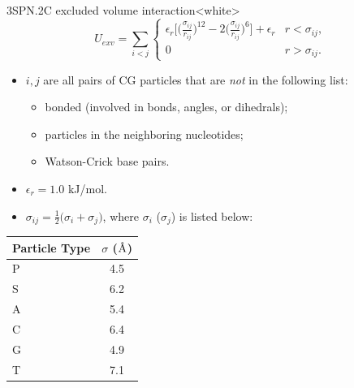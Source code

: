 \begin{smallpage}{3SPN.2C excluded volume interaction}<white>
  \begin{equation}
    \label{eq:dna_3spn2c_nonlocal_exv}
    U_{exv} = \sum_{i<j}
    \begin{cases}\displaystyle
      \epsilon_r\bigg[ \Big(\frac{\sigma_{ij}}{r_{ij}} \Big)^{12} - 2 \Big(\frac{\sigma_{ij}}{r_{ij}} \Big)^6 \bigg]+ \epsilon_r & r < \sigma_{ij},  \\
      0 & r > \sigma_{ij}.
    \end{cases}
  \end{equation}
  \tcblower
  \begin{itemize}
  \item $i, j$ are all pairs of CG particles that are \emph{not} in the
    following list:
    \begin{itemize}
    \item bonded (involved in bonds, angles, or dihedrals);
    \item particles in the neighboring nucleotides;
    \item Watson-Crick base pairs.
    \end{itemize}
  \item $\epsilon_{r} = 1.0$ kJ/mol.
  \item $\displaystyle \sigma_{ij} = \frac{1}{2}\big( \sigma_i + \sigma_j
    \big)$, where $\sigma_i$ ($\sigma_j$) is listed below:
  \end{itemize}
  \begin{center}
    \begin{tabular}{lc}
      \toprule
      Particle Type    & $\sigma$ ($\textup{\AA}$) \\
      \midrule
      P  &  4.5 \\
      S  &  6.2 \\
      A  &  5.4 \\
      C  &  6.4 \\
      G  &  4.9 \\
      T  &  7.1 \\
      \bottomrule
    \end{tabular}
  \end{center}
\end{smallpage}
